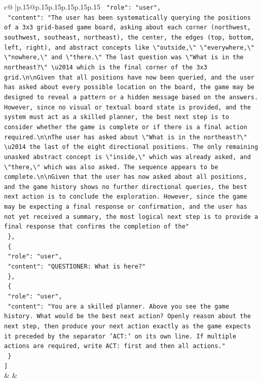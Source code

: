 \documentclass{article}
\begin{document}
{\begin{supertabular}{c@{$\;$}|p{.15\linewidth}@{}p{.15\linewidth}p{.15\linewidth}p{.15\linewidth}p{.15\linewidth}p{.15\linewidth}}
{{{\texttt{    "role": "user",} \\
\texttt{    "content": "The user has been systematically querying the positions of a 3x3 grid{-}based game board, asking about each corner (northwest, southwest, southeast, northeast), the center, the edges (top, bottom, left, right), and abstract concepts like \textbackslash{}"outside,\textbackslash{}" \textbackslash{}"everywhere,\textbackslash{}" \textbackslash{}"nowhere,\textbackslash{}" and \textbackslash{}"there.\textbackslash{}" The last question was \textbackslash{}"What is in the northeast?\textbackslash{}" \textbackslash{}u2014 which is the final corner of the 3x3 grid.\textbackslash{}n\textbackslash{}nGiven that all positions have now been queried, and the user has asked about every possible location on the board, the game may be designed to reveal a pattern or a hidden message based on the answers. However, since no visual or textual board state is provided, and the system must act as a skilled planner, the best next step is to consider whether the game is complete or if there is a final action required.\textbackslash{}n\textbackslash{}nThe user has asked about \textbackslash{}"What is in the northeast?\textbackslash{}" \textbackslash{}u2014 the last of the eight directional positions. The only remaining unasked abstract concept is \textbackslash{}"inside,\textbackslash{}" which was already asked, and \textbackslash{}"there,\textbackslash{}" which was also asked. The sequence appears to be complete.\textbackslash{}n\textbackslash{}nGiven that the user has now asked about all positions, and the game history shows no further directional queries, the best next action is to conclude the exploration. However, since the game may be expecting a final response or confirmation, and the user has not yet received a summary, the most logical next step is to provide a final response that confirms the completion of the"} \\
\texttt{  \},} \\
\texttt{  \{} \\
\texttt{    "role": "user",} \\
\texttt{    "content": "QUESTIONER: What is here?"} \\
\texttt{  \},} \\
\texttt{  \{} \\
\texttt{    "role": "user",} \\
\texttt{    "content": "You are a skilled planner. Above you see the game history. What would be the best next action? Openly reason about the next step, then produce your next action exactly as the game expects it preceded by the separator 'ACT:' on its own line. If multiple actions are required, write ACT: first and then all actions."} \\
\texttt{  \}} \\
\texttt{{]}} \\
            }
        }
    }
    & & \\ \\


\end{supertabular}}
\end{document}
